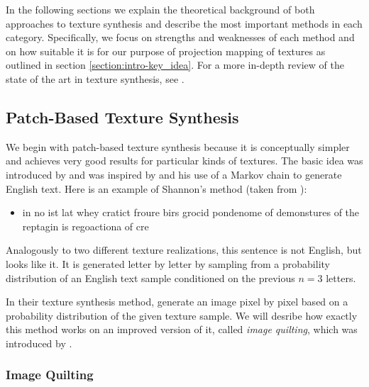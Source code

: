 In the following sections we explain the theoretical background of both approaches to texture synthesis and describe the most important methods in each category. Specifically, we focus on strengths and weaknesses of each method and on how suitable it is for our purpose of projection mapping of textures as outlined in section \ref{section:intro-key_idea}. For a more in-depth review of the state of the art in texture synthesis, see \citet{Raad2018}.

\subsection{Patch-Based Texture Synthesis}
\label{section:background-texture_synthesis-patch_based}

We begin with patch-based texture synthesis because it is conceptually simpler and achieves very good results for particular kinds of textures. The basic idea was introduced by \citet{Efros1999} and was inspired by \citet{Shannon1948} and his use of a Markov chain to generate English text. Here is an example of Shannon's method (taken from \citet{Raad2018}):

\begin{itemize}
    \item in no ist lat whey cratict froure birs grocid pondenome of demonstures of the reptagin is regoactiona of cre
\end{itemize}

Analogously to two different texture realizations, this sentence is not English, but looks like it. It is generated letter by letter by sampling from a probability distribution of an English text sample conditioned on the previous \(n = 3\) letters.

In their texture synthesis method, \citet{Efros1999} generate an image pixel by pixel based on a probability distribution of the given texture sample. We will desribe how exactly this method works on an improved version of it, called \textit{image quilting}, which was introduced by \citet{Efros2001}.

\subsubsection{Image Quilting}
\label{section:background-texture_synthesis-patch_based-quilting}

